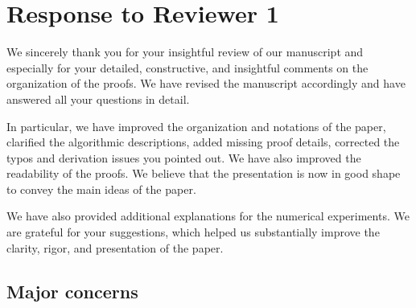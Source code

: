 \section{Response to Reviewer 1}
 {\color{blue}
  We sincerely thank you for your insightful review of our manuscript and especially for your detailed, constructive, and insightful comments on the organization of the proofs.
  We have revised the manuscript accordingly and have answered all your questions in detail.

  In particular, we have improved the organization and notations of the paper, clarified the algorithmic descriptions, added missing proof details, corrected the typos and derivation issues you pointed out.  We have also improved the readability of the proofs. We believe that the presentation is now in good shape to convey the main ideas of the paper.

  We have also provided additional explanations for the numerical experiments. We are grateful for your suggestions, which helped us substantially improve the clarity, rigor, and presentation of the paper.

 }
\subsection{Major concerns}


